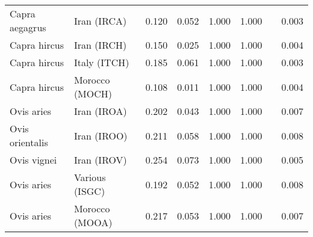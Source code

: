 \begin{center}
\begin{adjustbox}{width = 1\textwidth}
\begin{tabular}{|l|l|r|r|r|r|r|}
      Capra aegagrus &                     Iran (IRCA) &                                              0.120 &                                              0.052 &                1.000 &                                  1.000~~ &              0.003 \\
        Capra hircus &                     Iran (IRCH) &                                              0.150 &                                              0.025 &                1.000 &                                  1.000~~ &              0.004 \\
        Capra hircus &                    Italy (ITCH) &                                              0.185 &                                              0.061 &                1.000 &                                  1.000~~ &              0.003 \\
        Capra hircus &                  Morocco (MOCH) &                                              0.108 &                                              0.011 &                1.000 &                                  1.000~~ &              0.004 \\
          Ovis aries &                     Iran (IROA) &                                              0.202 &                                              0.043 &                1.000 &                                  1.000~~ &              0.007 \\
     Ovis orientalis &                     Iran (IROO) &                                              0.211 &                                              0.058 &                1.000 &                                  1.000~~ &              0.008 \\
         Ovis vignei &                     Iran (IROV) &                                              0.254 &                                              0.073 &                1.000 &                                  1.000~~ &              0.005 \\
          Ovis aries &                  Various (ISGC) &                                              0.192 &                                              0.052 &                1.000 &                                  1.000~~ &              0.008 \\
          Ovis aries &                  Morocco (MOOA) &                                              0.217 &                                              0.053 &                1.000 &                                  1.000~~ &              0.007 \\

\end{tabular}
\end{adjustbox}
\end{center}
